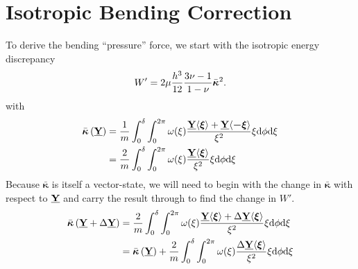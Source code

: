 \section{Isotropic Bending Correction}
To derive the bending ``pressure'' force, we start with the isotropic energy discrepancy
%
\begin{equation}
    W'=2\mu\frac{h^3}{12}\frac{3\nu-1}{1-\nu}\bar{\boldsymbol{\kappa}}^2. \notag
\end{equation}
%
with
%
\begin{align}
    \bar{\boldsymbol{\kappa}}\left(\vstate{Y}{}{}\right) &= \frac{1}{m} \int_0^\delta \int_0^{2\pi}\omega(\xi)\frac{\vstate{Y}{}{\boldsymbol{\xi}}+\vstate{Y}{}{\boldsymbol{-\xi}}}{\xi^2} \xi {\rm d}\phi {\rm d}\xi \notag \\
    &= \frac{2}{m} \int_0^\delta \int_0^{2\pi}\omega(\xi)\frac{\vstate{Y}{}{\boldsymbol{\xi}}}{\xi^2} \xi {\rm d}\phi {\rm d}\xi \notag
\end{align}
Because $\bar{\boldsymbol{\kappa}}$ is itself a vector-state, we will need to begin with the change in $\bar{\boldsymbol{\kappa}}$ with respect to $\vstate{Y}{}{}$ and carry the result through to find the change in $W'$.
\begin{align}
    \bar{\boldsymbol{\kappa}}\left(\vstate{Y}{}{}+\Delta\vstate{Y}{}{}\right) &= \frac{2}{m} \int_0^\delta \int_0^{2\pi}\omega(\xi)\frac{\vstate{Y}{}{\boldsymbol{\xi}}+\Delta\vstate{Y}{}{\boldsymbol{\xi}}}{\xi^2} \xi {\rm d}\phi {\rm d}\xi \notag \\
    &= \bar{\boldsymbol{\kappa}}\left(\vstate{Y}{}{}\right) + \frac{2}{m} \int_0^\delta \int_0^{2\pi}\omega(\xi)\frac{\Delta\vstate{Y}{}{\boldsymbol{\xi}}}{\xi^2} \xi {\rm d}\phi {\rm d}\xi \notag 
\end{align}
%
%
